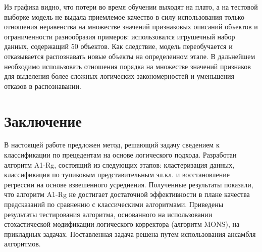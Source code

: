 \documentclass{article}
\begin{document}
\begin{figure}[H]
\noindent{}
\end{figure}
Из графика видно, что потери во время обучении выходят на плато, а на тестовой выборке модель не выдала приемлемое качество в силу использования только отношения неравенства на множестве значений признаковых описаний объектов и ограниченности разнообразия примеров: использовался игрушечный набор данных, содержащий 50 объектов. Как следствие, модель переобучается и отказывается распознавать новые объекты на определенном этапе. В дальнейшем необходимо использовать отношения порядка на множестве значений признаков для выделения более сложных логических закономерностей и уменьшения отказов в распознавании.

\section{Заключение}

В настоящей работе предложен метод, решающий задачу сведением к классификации по прецедентам на основе логического подхода. Разработан алгоритм A1-Rg, состоящий из следующих этапов: кластеризация данных, классификация по тупиковым представительным эл.кл. и восстановление регрессии на основе взвешенного усреднения. Полученные результаты показали, что алгоритм A1-Rg не достигает достаточной эффективности в плане качества предсказаний по сравнению с классическими алгоритмами. Приведены результаты тестирования алгоритма, основанного на использовании стохастической модификации логического корректора (алгоритм MONS), на прикладных задачах. Поставленная задача решена путем использования ансамбля алгоритмов.
\end{document}
